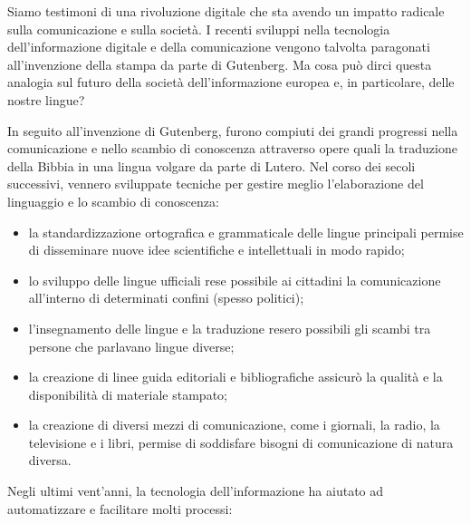 \documentclass[]{../../metanetpaper}
\begin{document}
\begin{multicols}{2}

Siamo testimoni di una rivoluzione digitale che sta avendo un impatto radicale
sulla comunicazione e sulla societ\`{a}. I recenti sviluppi nella tecnologia
dell'informazione digitale e della comunicazione vengono talvolta paragonati
all'invenzione della stampa da parte di Gutenberg. Ma cosa pu\`{o} dirci
questa analogia sul futuro della societ\`{a} dell'informazione europea e, in
particolare, delle nostre lingue?



In seguito all'invenzione di Gutenberg, furono compiuti dei grandi progressi
nella comunicazione e nello scambio di conoscenza attraverso opere quali la
traduzione della Bibbia in una lingua volgare da parte di Lutero. Nel corso
dei secoli successivi, vennero sviluppate tecniche per gestire meglio
l'elaborazione del linguaggio e lo scambio di conoscenza:\

\begin{itemize}
\item la standardizzazione ortografica e grammaticale delle lingue principali
  permise di disseminare nuove idee scientifiche e intellettuali in modo
  rapido;
\item lo sviluppo delle lingue ufficiali rese possibile ai cittadini la
  comunicazione all'interno di determinati confini (spesso politici);
\item l'insegnamento delle lingue e la traduzione resero possibili gli scambi tra
  persone che parlavano lingue diverse;
\item la creazione di linee guida editoriali e bibliografiche assicur\`{o} la
  qualit\`{a} e la disponibilit\`{a} di materiale stampato;
\item la creazione di diversi mezzi di comunicazione, come i giornali, la radio,
  la televisione e i libri, permise di soddisfare bisogni di comunicazione di
  natura diversa.
\end{itemize}


Negli ultimi vent'anni, la tecnologia dell'informazione ha aiutato ad
automatizzare e facilitare molti processi:


\end{multicols}
\end{document}
